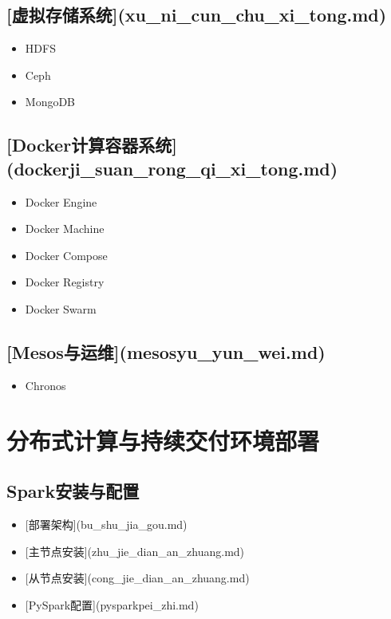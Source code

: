 \documentclass[letterpaper,10pt,english]{sphinxmanual}
\begin{document}
\section{{[}虚拟存储系统{]}(xu\_ni\_cun\_chu\_xi\_tong.md)}
\label{index:xu-ni-cun-chu-xi-tong-md}\begin{itemize}
\item {} 
HDFS

\item {} 
Ceph

\item {} 
MongoDB

\end{itemize}


\section{{[}Docker计算容器系统{]}(dockerji\_suan\_rong\_qi\_xi\_tong.md)}
\label{index:docker-dockerji-suan-rong-qi-xi-tong-md}\begin{itemize}
\item {} 
Docker Engine

\item {} 
Docker Machine

\item {} 
Docker Compose

\item {} 
Docker Registry

\item {} 
Docker Swarm

\end{itemize}


\section{{[}Mesos与运维{]}(mesosyu\_yun\_wei.md)}
\label{index:mesos-mesosyu-yun-wei-md}\begin{itemize}
\item {} 
Chronos

\end{itemize}


\chapter{分布式计算与持续交付环境部署}
\label{index:id1}

\section{Spark安装与配置}
\label{index:spark}\begin{itemize}
\item {} 
{[}部署架构{]}(bu\_shu\_jia\_gou.md)

\item {} 
{[}主节点安装{]}(zhu\_jie\_dian\_an\_zhuang.md)

\item {} 
{[}从节点安装{]}(cong\_jie\_dian\_an\_zhuang.md)

\item {} 
{[}PySpark配置{]}(pysparkpei\_zhi.md)

\end{itemize}
\end{document}
